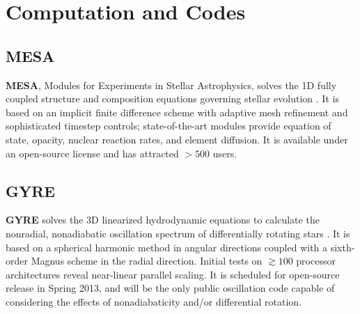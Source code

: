 \section{Computation and Codes}
    
    
{\color{green}    
\subsection{MESA}
}

\textbf{MESA}, Modules for Experiments in Stellar
Astrophysics, solves the 1D fully coupled structure and composition
equations governing stellar evolution . It
is based on an implicit finite difference scheme with adaptive mesh
refinement and sophisticated timestep controls; 
state-of-the-art modules provide equation of state, opacity, nuclear
reaction rates, and element diffusion.
It is 
available under an open-source license and has  attracted $>500$ 
 users.

    
    
{\color{brown}    
\subsection{GYRE}}
 \textbf{GYRE} solves the 3D linearized hydrodynamic
equations to calculate the nonradial, nonadiabatic oscillation
spectrum of differentially rotating stars \citep{bard11}. It is based
on a spherical harmonic method in angular directions coupled with a
sixth-order Magnus scheme in the radial direction. Initial tests on
$\gtrsim 100$ processor architectures reveal near-linear parallel
scaling. It is scheduled for open-source release in
Spring 2013, and will be the only public oscillation code capable of
considering the effects of nonadiabaticity and/or differential
rotation.
